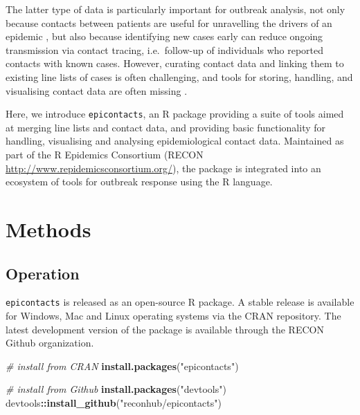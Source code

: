 \documentclass[9pt,a4paper,]{extarticle}
\newenvironment{Shaded}{\begin{snugshade}}{\end{snugshade}}
\newcommand{\KeywordTok}[1]{\textcolor[rgb]{0.13,0.29,0.53}{\textbf{#1}}}
\newcommand{\StringTok}[1]{\textcolor[rgb]{0.31,0.60,0.02}{#1}}
\newcommand{\CommentTok}[1]{\textcolor[rgb]{0.56,0.35,0.01}{\textit{#1}}}
\newcommand{\OperatorTok}[1]{\textcolor[rgb]{0.81,0.36,0.00}{\textbf{#1}}}
\newcommand{\NormalTok}[1]{#1}
\theoremstyle{definition}
\theoremstyle{definition}
\theoremstyle{definition}
\theoremstyle{remark}
\begin{document}
The latter type of data is particularly important for outbreak analysis, not only because contacts between patients are useful for unravelling the drivers of an epidemic \citep{agua-agum:2016}\citep{cauchemez:2016}, but also because identifying new cases early can reduce ongoing transmission via contact tracing, i.e.~follow-up of individuals who reported contacts with known cases\citep{senga:2017}\citep{saurabh:2017}. However, curating contact data and linking them to existing line lists of cases is often challenging, and tools for storing, handling, and visualising contact data are often missing \citep{who:2009}\citep{rakesh:2014}.

Here, we introduce \texttt{epicontacts}, an R\citep{rcore} package providing a suite of tools aimed at merging line lists and contact data, and providing basic functionality for handling, visualising and analysing epidemiological contact data. Maintained as part of the R Epidemics Consortium (RECON \url{http://www.repidemicsconsortium.org/}), the package is integrated into an ecosystem of tools for outbreak response using the R language.

\section{Methods}\label{methods}

\subsection{Operation}\label{operation}

\texttt{epicontacts} is released as an open-source R package. A stable release is available for Windows, Mac and Linux operating systems via the CRAN repository. The latest development version of the package is available through the RECON Github organization.

\begin{Shaded}
\begin{Highlighting}[]
\CommentTok{# install from CRAN}
\KeywordTok{install.packages}\NormalTok{(}\StringTok{"epicontacts"}\NormalTok{)}

\CommentTok{# install from Github}
\KeywordTok{install.packages}\NormalTok{(}\StringTok{"devtools"}\NormalTok{)}
\NormalTok{devtools}\OperatorTok{::}\KeywordTok{install_github}\NormalTok{(}\StringTok{"reconhub/epicontacts"}\NormalTok{)}
\end{Highlighting}
\end{Shaded}
\end{document}
